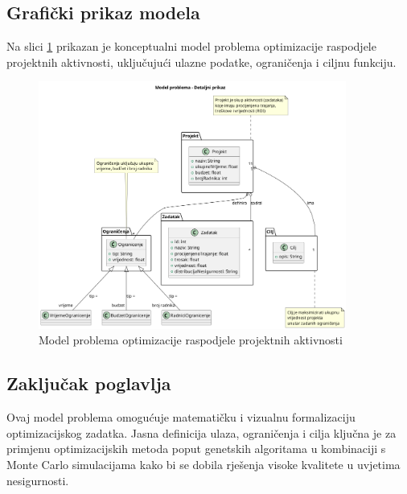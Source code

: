 \subsection{Grafički prikaz modela}
Na slici \ref{fig:model_problema} prikazan je konceptualni model problema optimizacije raspodjele projektnih aktivnosti, uključujući ulazne podatke, ograničenja i ciljnu funkciju.

\begin{figure}
    \centering
    \includegraphics[width=0.9\textwidth]{slike/model_problema.png}
    \caption{Model problema optimizacije raspodjele projektnih aktivnosti}
    \label{fig:model_problema}
\end{figure}

\subsection{Zaključak poglavlja}
Ovaj model problema omogućuje matematičku i vizualnu formalizaciju optimizacijskog zadatka. Jasna definicija ulaza, ograničenja i cilja ključna je za primjenu optimizacijskih metoda poput genetskih algoritama \cite{Goldberg1989} u kombinaciji s Monte Carlo simulacijama kako bi se dobila rješenja visoke kvalitete u uvjetima nesigurnosti.
